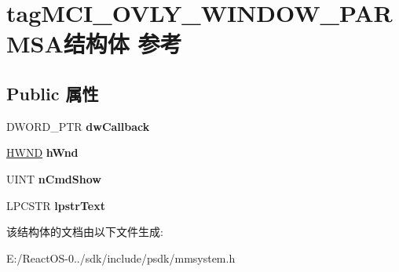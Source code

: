 \hypertarget{structtag_m_c_i___o_v_l_y___w_i_n_d_o_w___p_a_r_m_s_a}{}\section{tag\+M\+C\+I\+\_\+\+O\+V\+L\+Y\+\_\+\+W\+I\+N\+D\+O\+W\+\_\+\+P\+A\+R\+M\+S\+A结构体 参考}
\label{structtag_m_c_i___o_v_l_y___w_i_n_d_o_w___p_a_r_m_s_a}
\subsection*{Public 属性}
\begin{DoxyCompactItemize}
\item 
\mbox{\label{structtag_m_c_i___o_v_l_y___w_i_n_d_o_w___p_a_r_m_s_a_a5031c536602689b755c16c6e8d2ac022}} 
D\+W\+O\+R\+D\+\_\+\+P\+TR {\bfseries dw\+Callback}
\item 
\mbox{\label{structtag_m_c_i___o_v_l_y___w_i_n_d_o_w___p_a_r_m_s_a_a36f956ceac36861badac3cec9c18dd84}} 
\hyperlink{interfacevoid}{H\+W\+ND} {\bfseries h\+Wnd}
\item 
\mbox{\label{structtag_m_c_i___o_v_l_y___w_i_n_d_o_w___p_a_r_m_s_a_a861a4c612fe9a0bf09c7d8b90f619d49}} 
U\+I\+NT {\bfseries n\+Cmd\+Show}
\item 
\mbox{\label{structtag_m_c_i___o_v_l_y___w_i_n_d_o_w___p_a_r_m_s_a_aca65eeb62e29cb3bc6e40b7d77b492f8}} 
L\+P\+C\+S\+TR {\bfseries lpstr\+Text}
\end{DoxyCompactItemize}


该结构体的文档由以下文件生成\+:\begin{DoxyCompactItemize}
\item 
E\+:/\+React\+O\+S-\/0../sdk/include/psdk/mmsystem.\+h\end{DoxyCompactItemize}
